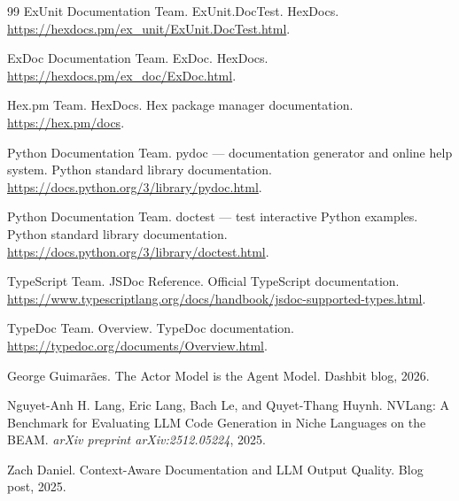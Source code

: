 \documentclass[11pt]{article}
\begin{document}
\begin{thebibliography}{99}
ExUnit Documentation Team.
\newblock ExUnit.DocTest.
\newblock HexDocs.
\newblock \url{https://hexdocs.pm/ex_unit/ExUnit.DocTest.html}.

ExDoc Documentation Team.
\newblock ExDoc.
\newblock HexDocs.
\newblock \url{https://hexdocs.pm/ex_doc/ExDoc.html}.

Hex.pm Team.
\newblock HexDocs.
\newblock Hex package manager documentation.
\newblock \url{https://hex.pm/docs}.

Python Documentation Team.
\newblock pydoc --- documentation generator and online help system.
\newblock Python standard library documentation.
\newblock \url{https://docs.python.org/3/library/pydoc.html}.

Python Documentation Team.
\newblock doctest --- test interactive Python examples.
\newblock Python standard library documentation.
\newblock \url{https://docs.python.org/3/library/doctest.html}.

TypeScript Team.
\newblock JSDoc Reference.
\newblock Official TypeScript documentation.
\newblock \url{https://www.typescriptlang.org/docs/handbook/jsdoc-supported-types.html}.

TypeDoc Team.
\newblock Overview.
\newblock TypeDoc documentation.
\newblock \url{https://typedoc.org/documents/Overview.html}.

George Guimar\~{a}es.
\newblock The Actor Model is the Agent Model.
\newblock Dashbit blog, 2026.

Nguyet-Anh H. Lang, Eric Lang, Bach Le, and Quyet-Thang Huynh.
\newblock NVLang: A Benchmark for Evaluating LLM Code Generation in Niche Languages on the BEAM.
\newblock \emph{arXiv preprint arXiv:2512.05224}, 2025.

Zach Daniel.
\newblock Context-Aware Documentation and LLM Output Quality.
\newblock Blog post, 2025.

\end{thebibliography}
\end{document}
